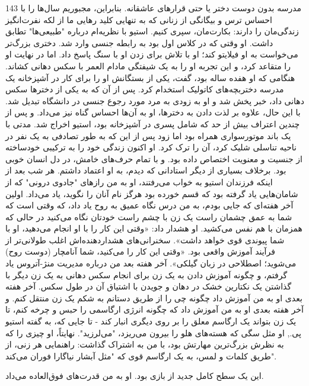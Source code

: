 143  
مدرسه بدون دوست دختر یا حتی قرارهای عاشقانه. بنابراین، مجبوریم سال‌ها را با احساس ترس و بیگانگی از زنانی که به تنهایی کلید رهایی ما از لکه نفرت‌انگیز زندگی‌مان را دارند:‌ بکارت‌مان، سپری کنیم.  
استیو با نظریه‌ام درباره "طبیعی‌ها" تطابق داشت. او وقتی که در کلاس اول بود به رابطه جنسی وارد شد. دختری بزرگ‌تر می‌خواست به او فیلایتو کند؛ او با تلاش برای زدن او با سنگ پاسخ داد. اما در نهایت او را متقاعد کرد، و این تجربه او را به یک شیفتگی مادام العمر با سکس دهانی کشاند. هنگامی که او هفده ساله بود، گفت، یکی از بستگانش او را برای کار در آشپزخانه یک مدرسه دختربچه‌های کاتولیک استخدام کرد. پس از آن که به یکی از دخترها سکس دهانی داد، خبر پخش شد و او به زودی به مرد مورد رجوع جنسی در دانشگاه تبدیل شد. با این حال، علاوه بر لذت دادن به دخترها، او به آن‌ها احساس گناه نیز می‌داد. و پس از چندین اعتراف بیش از حد که شامل پسری در آشپزخانه بود، استیو اخراج شد.  
مدتی با یک باند موتورسواری همراه بود اما زود پس از این که به طور تصادفی به یک نفر در ناحیه تناسلی شلیک کرد، آن را ترک کرد. او اکنون زندگی خود را به ترکیبی خودساخته از جنسیت و معنویت اختصاص داده بود. و با تمام حرف‌های خامش، در دل انسان خوبی بود. برخلاف بسیاری از دیگر استادانی که دیدم، به او اعتماد داشتم.  
هر شب بعد از اینکه فرزندان استیو به خواب می‌رفتند، او به من رازهای "جادوی درونی" که از شامان‌هایی یاد گرفته بود که قسم خورده بود هرگز نام آنان را نگوید، یاد می‌داد. اولین آخر هفته‌ای که جایی بودم، به من درس نگاه عمیق به روح یاد داد، که وقتی است که شما به عمق چشمان راست یک زن با چشم راست خودتان نگاه می‌کنید در حالی که همزمان با هم نفس می‌کشید.  
او هشدار داد: «وقتی این کار را با او انجام می‌دهید، او با شما پیوندی قوی خواهد داشت». سخنرانی‌های هشداردهنده‌اش اغلب طولانی‌تر از فرآیند آموزش واقعی بود. «وقتی این کار را می‌کنید، شما آنامچار (دوست روح) می‌شوید؛ اصطلاحی در زبان گیلکی».  
آخر هفته بعد من درباره مدیریت منژ-آتروس یاد گرفتم، و چگونه آموزش دادن به یک زن برای انجام سکس دهانی به یک زن دیگر با گذاشتن یک نکتارین خشک در دهان و جویدن با اشتیاق آن در طول سکس. آخر هفته بعدی او به من آموزش داد چگونه چی را از طریق دستانم به شکم یک زن منتقل کنم. و آخر هفته بعدی او به من آموزش داد که چگونه انرژی ارگاسمی را حبس و چرخه کنم، تا یک زن بتواند یک ارگاسم معلق را بر روی دیگری انبار کند - تا جایی که، به گفته استیو پی., او مثل سگی که هسته‌های هلو را بیرون می‌ریزد، "می‌لرزید". نهایتاً، او چیزی را که به نظرش بزرگ‌ترین مهارتش بود، با من به اشتراک گذاشت: راهنمایی هر زنی، از طریق کلمات و لمس، به یک ارگاسم قوی که "مثل آبشار نیاگارا فوران می‌کند".  

این یک سطح کامل جدید از بازی بود. او به من قدرت‌های فوق‌العاده می‌داد.